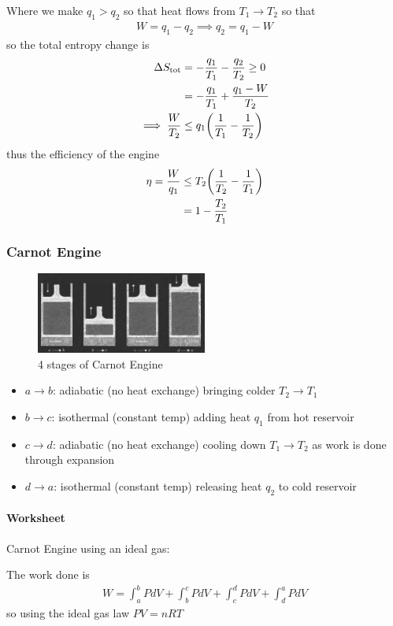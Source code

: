 \documentclass[../main.tex]{subfiles}
\begin{document}
Where we make $q_1 > q_2$ so that heat flows from $T_1 \to T_2$ so that
\begin{align*}
    W = q_1 - q_2 \implies q_2 = q_1 - W
\end{align*}
so the total entropy change is
\begin{align*}
    \Delta S_\text{tot} &= -\frac{q_1}{T_1} - \frac{q_2}{T_2} \geq 0 \\
    &= -\frac{q_1}{T_1} + \frac{q_1 - W}{T_2} \\
    \implies \frac{W}{T_2} &\leq q_1 \qt(\frac{1}{T_1} - \frac{1}{T_2})
\end{align*}
thus the efficiency of the engine
\begin{align*}
    \eta = \frac{W}{q_1} &\leq  T_2 \qt(\frac{1}{T_2} - \frac{1}{T_1}) \\
    &= 1 - \frac{T_2}{T_1}
\end{align*}

\subsubsection*{Carnot Engine} 

\begin{figure}[ht]
    \centering
    \includegraphics[width=0.5\textwidth]{fig5_4.png}
    \caption{4 stages of Carnot Engine}
    \label{fig:5_4}
\end{figure}

\begin{itemize}
    \item $a \to b$: adiabatic (no heat exchange) bringing colder $T_2 \to T_1$
    \item $b \to c$: isothermal (constant temp) adding heat $q_1$ from hot reservoir
    \item $c \to d$: adiabatic (no heat exchange) cooling down $T_1 \to T_2$ as work is done through expansion
    \item $d \to a$: isothermal (constant temp) releasing heat $q_2$ to cold reservoir
\end{itemize}

\paragraph{Worksheet} Carnot Engine using an ideal gas:

The work done is
\begin{align*}
    W = \int_a^b PdV + \int_b^c PdV + \int_c^d PdV + \int_d^a PdV
\end{align*}
so using the ideal gas law $PV = nRT$
\end{document}
